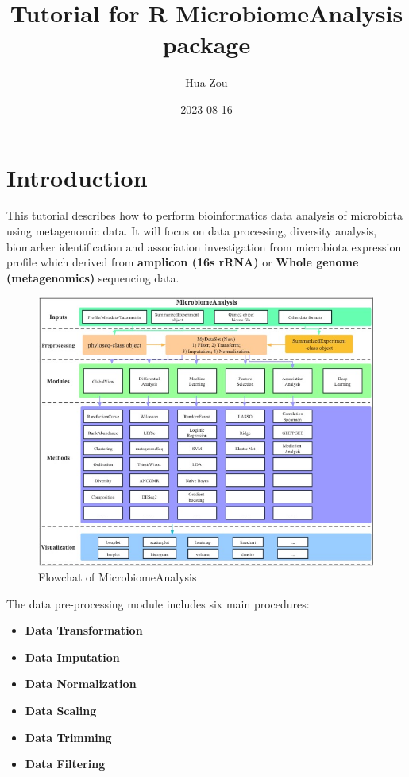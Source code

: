 \documentclass[
]{book}
\title{Tutorial for R MicrobiomeAnalysis package}
\author{Hua Zou}
\date{2023-08-16}
\providecommand{\tightlist}{%
  \setlength{\itemsep}{0pt}\setlength{\parskip}{0pt}}
\begin{document}
\maketitle

{
\setcounter{tocdepth}{1}
\tableofcontents
}
\hypertarget{introduction}{%
\chapter{Introduction}\label{introduction}}

This tutorial describes how to perform bioinformatics data analysis of microbiota using metagenomic data. It will focus on data processing, diversity analysis, biomarker identification and association investigation from microbiota expression profile which derived from \textbf{amplicon (16s rRNA)} or \textbf{Whole genome (metagenomics)} sequencing data.

\begin{figure}

{\centering \includegraphics[width=1\linewidth,height=1\textheight]{./figures/Schematic} 

}

\caption{Flowchat of MicrobiomeAnalysis}\label{fig:unnamed-chunk-1}
\end{figure}

The data pre-processing module includes six main procedures:

\begin{itemize}
\tightlist
\item
  \textbf{Data Transformation}
\item
  \textbf{Data Imputation}
\item
  \textbf{Data Normalization}
\item
  \textbf{Data Scaling}
\item
  \textbf{Data Trimming}
\item
  \textbf{Data Filtering}
\end{itemize}
\end{document}
